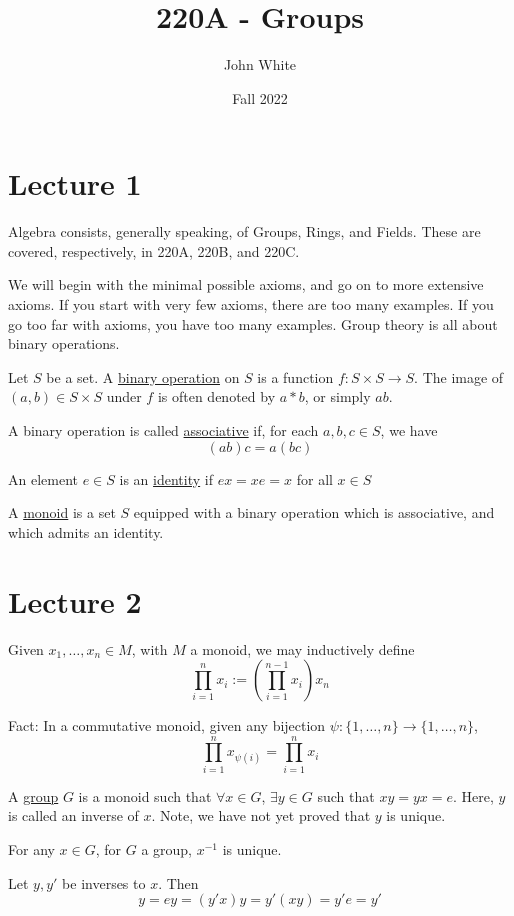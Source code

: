 \documentclass[x11names,reqno,14pt]{extarticle}
\title{220A - Groups}
\author{John White}
\date{Fall 2022}
\begin{document}
\section*{Lecture 1}

Algebra consists, generally speaking, of Groups, Rings, and Fields. These are covered, respectively, in 220A, 220B, and 220C. 


We will begin with the minimal possible axioms, and go on to more extensive axioms. If you start with very few axioms, there are too many examples. If you go too far with axioms, you have too many examples. Group theory is all about binary operations. 


Let $S$ be a set. A \underline{binary operation} on $S$ is a function $f:S\times S \to S$. The image of $(a, b) \in S \times S$ under $f$ is often denoted by $a * b$, or simply $ab$. 

 
A binary operation is called \underline{associative} if, for each $a, b, c \in S$, we have 
\[
(ab)c = a(bc)
\]


An element $e \in S$ is an \underline{identity} if $ex = xe = x$ for all $x \in S$

A \underline{monoid} is a set $S$ equipped with a binary operation which is associative, and which admits an identity. 

\section*{Lecture 2}

Given $x_1, \dots, x_n \in M$, with $M$ a monoid, we may inductively define
\[
\prod_{i=1}^nx_i :=(\prod_{i=1}^{n - 1}x_i)x_n
\]

Fact: In a commutative monoid, given any bijection $\psi:\{1,\dots,n\}\to\{1,\dots,n\}$, 
\[
\prod_{i=1}^nx_{\psi(i)} = \prod_{i=1}^nx_i
\]


A \underline{group} $G$ is a monoid such that $\forall x \in G$, $\exists y \in G$ such that $xy = yx = e$. Here, $y$ is called an inverse of $x$. Note, we have not yet proved that $y$ is unique. 

\claim

For any $x \in G$, for $G$ a group, $x^{-1}$ is unique. 

\proof

Let $y, y'$ be inverses to $x$. Then 
\[
y = ey = (y'x)y = y'(xy) = y'e = y'
\]
\end{document}
